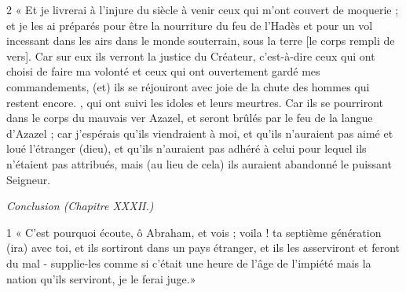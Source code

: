 \par 2 « Et je livrerai à l'injure du siècle à venir ceux qui m'ont couvert de moquerie ; et je les ai préparés pour être la nourriture du feu de l'Hadès et pour un vol incessant dans les airs dans le monde souterrain, sous la terre [le corps rempli de vers]. Car sur eux ils verront la justice du Créateur, c'est-à-dire ceux qui ont choisi de faire ma volonté et ceux qui ont ouvertement gardé mes commandements, (et) ils se réjouiront avec joie de la chute des hommes qui restent encore. , qui ont suivi les idoles et leurs meurtres. Car ils se pourriront dans le corps du mauvais ver Azazel, et seront brûlés par le feu de la langue d'Azazel ; car j'espérais qu'ils viendraient à moi, et qu'ils n'auraient pas aimé et loué l'étranger (dieu), et qu'ils n'auraient pas adhéré à celui pour lequel ils n'étaient pas attribués, mais (au lieu de cela) ils auraient abandonné le puissant Seigneur.


\par \textit{Conclusion (Chapitre XXXII.)}

\par 1 « C’est pourquoi écoute, ô Abraham, et vois ; voila ! ta septième génération (ira) avec toi, et ils sortiront dans un pays étranger, et ils les asserviront et feront du mal - supplie-les comme si c'était une heure de l'âge de l'impiété mais la nation qu'ils serviront, je le ferai juge.»

